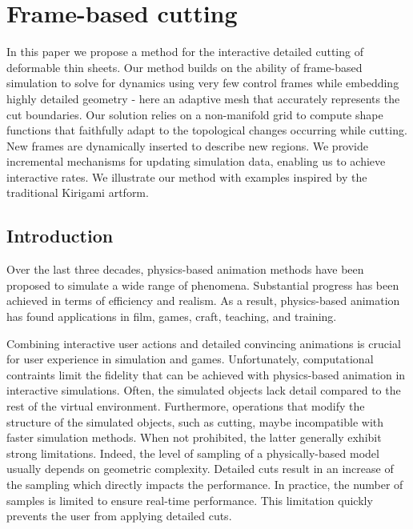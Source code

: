 \chapter{Frame-based cutting}
\label{chap:cutting}


In this paper we propose a method for the interactive detailed cutting of deformable thin sheets. Our method builds on the ability of frame-based simulation to solve for dynamics using very few control frames while embedding highly detailed geometry - here an adaptive mesh that accurately represents the cut boundaries.
Our solution relies on a non-manifold grid to compute shape functions that faithfully adapt to the topological changes occurring while cutting.  New frames are dynamically inserted to describe new regions. We provide incremental mechanisms for updating simulation data, enabling us to achieve interactive rates. We illustrate our method with examples inspired by the traditional Kirigami artform.

\section{Introduction}

Over the last three decades, physics-based animation methods have been proposed to simulate a wide range of phenomena. Substantial progress has been achieved in terms of efficiency and realism.  
As a result, physics-based animation has found applications in film, games, craft, teaching, and training.

Combining interactive user actions and detailed convincing animations is crucial for user experience in simulation and games. Unfortunately, computational contraints limit the 
fidelity that can be achieved with physics-based animation
in interactive simulations. Often, the simulated objects lack detail compared to the rest of the virtual environment.
Furthermore, operations that modify the structure of the simulated objects, such as cutting, 
maybe incompatible with faster simulation methods.
When not prohibited, the latter generally exhibit strong limitations. Indeed, the level of sampling of a physically-based model usually depends on geometric complexity. Detailed cuts result in an increase of the sampling which directly impacts the performance. In practice, the number of samples is limited to ensure real-time performance. This limitation quickly prevents the user from applying detailed cuts.  

